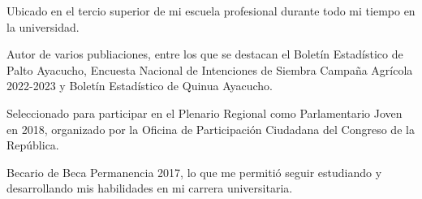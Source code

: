 
\begin{scholarship}
	{Ubicado en el tercio superior de mi escuela profesional durante todo mi tiempo en la universidad.}

	{Autor de varios publiaciones, entre los que se destacan el Boletín Estadístico de Palto Ayacucho, Encuesta Nacional de Intenciones de Siembra Campaña Agrícola 2022-2023 y Boletín Estadístico de Quinua Ayacucho.}

	{Seleccionado para participar en el Plenario Regional como Parlamentario Joven en 2018, organizado por la Oficina de Participación Ciudadana del Congreso de la República.}

	{Becario de Beca Permanencia 2017, lo que me permitió seguir estudiando y desarrollando mis habilidades en mi carrera universitaria.}
\end{scholarship}


